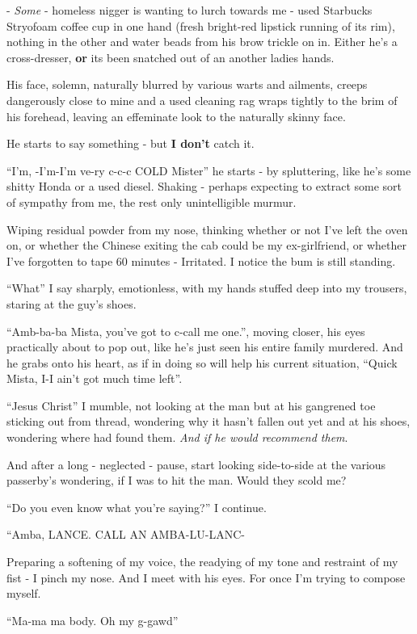\documentclass[19pt,openany]{book}
\begin{document}
- \textit{Some} - homeless nigger
is wanting to lurch towards me -
used Starbucks Stryofoam
coffee
cup in one hand (fresh
bright-red lipstick
running of its rim),
nothing in the other and
water beads from his brow
trickle on in. Either
he's a cross-dresser,
\textbf{or} its been
snatched out of an another
ladies hands.

His face, solemn, naturally
blurred by various warts
and ailments, creeps
dangerously close to mine and
a used cleaning rag wraps
tightly to the brim of his
forehead, leaving
an effeminate look to the
naturally skinny face.

He starts to say something - but
\textbf{I don't} catch it.

``I'm, -I'm-I'm ve-ry c-c-c COLD
Mister'' he starts - by spluttering,
like he's some shitty Honda
or a used diesel. Shaking -
perhaps expecting to extract some
sort of sympathy from me, the rest
only unintelligible murmur.

Wiping residual powder from
my nose, thinking whether
or not I've left the oven
on, or whether the Chinese
exiting the cab could be
my ex-girlfriend, or
whether I've forgotten to tape
{60 minutes} - Irritated. I notice
the bum is still standing.

``What'' I say sharply,
emotionless, with my hands
stuffed deep into my trousers,
staring at the guy's shoes.

``Amb-ba-ba Mista, you've got to
c-call me one.'', moving
closer, his eyes practically
about to pop out, like
he's just seen his entire
family murdered. And he grabs onto his heart,
as if in doing so will help his current situation,
``Quick Mista, I-I ain't got much time left''.

``Jesus Christ'' I mumble, not looking
at the man but at his gangrened toe
sticking out from thread,
wondering why it hasn't fallen out yet
and at his shoes, wondering where
had found them. \textit{And if he would
recommend them}.

And after a long - neglected - pause,
start looking side-to-side at the
various
passerby's wondering, if I was to hit
the man. Would they scold me?

``Do you even know what you're
saying?'' I continue.

``Amba, LANCE. CALL AN AMBA-LU-LANC-

Preparing a softening of my voice,
the readying of my tone and restraint
of my fist - I pinch my nose. And I
meet with his eyes. For once I'm trying
to compose myself.

``Ma-ma ma body. Oh my g-gawd''
\end{document}
